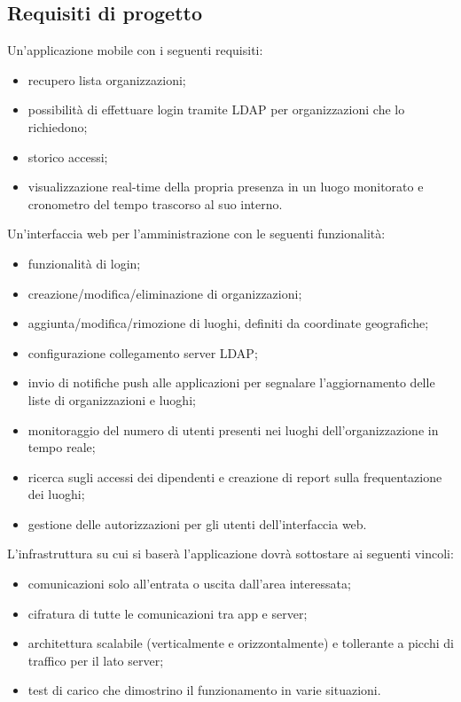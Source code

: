 \subsection{Requisiti di progetto}
Un'applicazione mobile con i seguenti requisiti:
\begin{itemize}
	\item recupero lista organizzazioni;
	\item possibilità di effettuare login tramite LDAP per organizzazioni che lo richiedono;
	\item storico accessi;
	\item visualizzazione real-time della propria presenza in un luogo monitorato e cronometro del tempo trascorso al suo interno.
\end{itemize}
Un'interfaccia web per l'amministrazione con le seguenti funzionalità:
\begin{itemize}
	\item funzionalità di login;
	\item creazione/modifica/eliminazione di organizzazioni;
	\item aggiunta/modifica/rimozione di luoghi, definiti da coordinate geografiche;
	\item configurazione collegamento server LDAP;
	\item invio di notifiche push alle applicazioni per segnalare l'aggiornamento delle liste di organizzazioni e luoghi;
	\item monitoraggio del numero di utenti presenti nei luoghi dell'organizzazione in tempo reale;
	\item ricerca sugli accessi dei dipendenti e creazione di report sulla frequentazione dei luoghi;
	\item gestione delle autorizzazioni per gli utenti dell'interfaccia web.
\end{itemize}
L'infrastruttura su cui si baserà l'applicazione dovrà sottostare ai seguenti vincoli:
\begin{itemize}
	\item comunicazioni solo all'entrata o uscita dall'area interessata;
	\item cifratura di tutte le comunicazioni tra app e server;
	\item architettura scalabile (verticalmente e orizzontalmente) e tollerante a picchi di traffico per il lato server;
	\item test di carico che dimostrino il funzionamento in varie situazioni.
\end{itemize}

